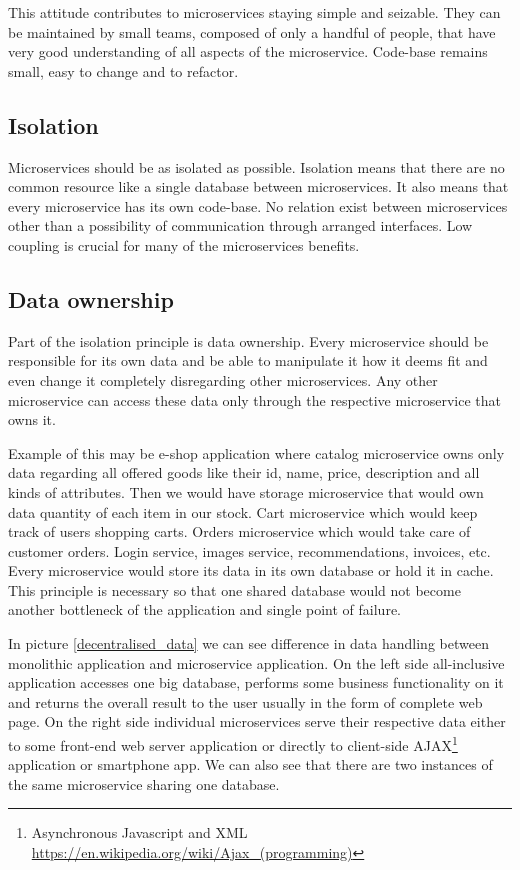\documentclass[12pt,oneside]{fithesis2}
\begin{document}
This attitude contributes to microservices staying simple and seizable. They can be maintained by small teams, composed of only a handful of people, that have very good understanding of all aspects of the microservice. Code-base remains small, easy to change and to refactor.

\subsection{Isolation}

Microservices should be as isolated as possible. Isolation means that there are no common resource like a single database between microservices. It also means that every microservice has its own code-base. No relation exist between microservices other than a possibility of communication through arranged interfaces. Low coupling is crucial for many of the microservices benefits.

\subsection{Data ownership}

Part of the isolation principle is data ownership. Every microservice should be responsible for its own data and be able to manipulate it how it deems fit and even change it completely disregarding other microservices. Any other microservice can access these data only through the respective microservice that owns it.

Example of this may be e-shop application where catalog microservice owns only data regarding all offered goods like their id, name, price, description and all kinds of attributes. Then we would have storage microservice that would own data quantity of each item in our stock. Cart microservice which would keep track of users shopping carts. Orders microservice which would take care of customer orders. Login service, images service, recommendations, invoices, etc.
Every microservice would store its data in its own database or hold it in cache. This principle is necessary so that one shared database would not become another bottleneck of the application and single point of failure.

In picture \ref{decentralised_data} we can see difference in data handling between monolithic application and microservice application. On the left side all-inclusive application accesses one big database, performs some business functionality on it and returns the overall result to the user usually in the form of complete web page. On the right side individual microservices serve their respective data either to some front-end web server application or directly to client-side AJAX\footnote{Asynchronous Javascript and XML \url{https://en.wikipedia.org/wiki/Ajax_(programming)}} application or smartphone app. We can also see that there are two instances of the same microservice sharing one database.
\end{document}
